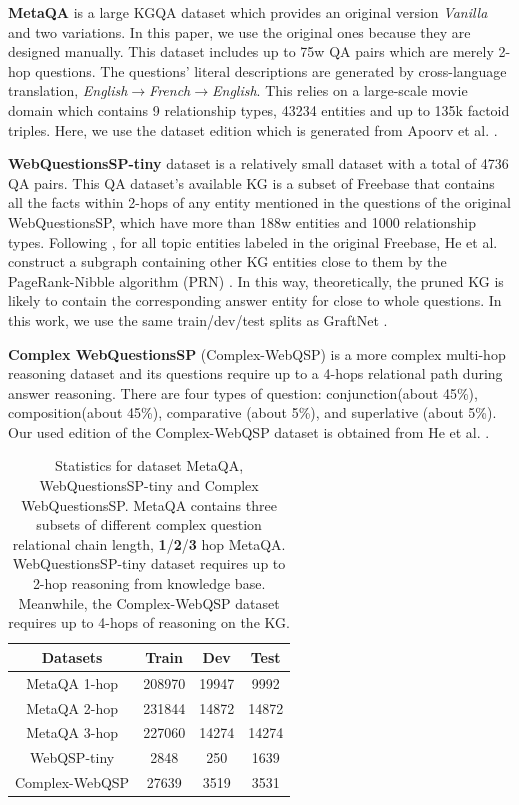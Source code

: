 \documentclass[pdflatex,sn-mathphys]{sn-jnl}%
\theoremstyle{thmstyleone}%
\theoremstyle{thmstyletwo}%
\theoremstyle{thmstylethree}%
\begin{document}
\textbf{MetaQA} \cite{zhang2018metaQA} is a large KGQA dataset which provides an original version \textit{Vanilla} and two variations. In this paper, we use the original ones because they are designed manually. This dataset includes up to 75w QA pairs which are merely 2-hop questions. The questions' literal descriptions are generated by cross-language translation, \textit{English$\rightarrow$French$\rightarrow$English}. This relies on a large-scale movie domain which contains 9 relationship types, 43234 entities and up to 135k factoid triples. Here, we use the dataset edition which is generated from Apoorv et al. \cite{apoorv2020embedKGQA}.

\textbf{WebQuestionsSP-tiny} \cite{tauyih2016wbquestion} dataset is a relatively small dataset with a total of 4736 QA pairs. This QA dataset's available KG is a subset of Freebase  that contains all the facts within 2-hops of any entity mentioned in the questions of the original WebQuestionsSP, which have more than 188w entities and 1000 relationship types. Following \cite{apoorv2020embedKGQA}, for all topic entities labeled in the original Freebase, He et al. \cite{he2021stu-teaQA} construct a subgraph containing other KG entities close to them by the PageRank-Nibble algorithm (PRN) \cite{rpn}. In this way, theoretically, the pruned KG is likely to contain the corresponding answer entity for close to whole questions. In this work, we use the same train/dev/test splits as GraftNet \cite{sun2018graftnet}.

\textcolor[rgb]{1,0,0}{
\textbf{Complex WebQuestionsSP} (Complex-WebQSP)\cite{TalmorCWQ} is a more complex multi-hop reasoning dataset and its questions require up to a 4-hops relational path during answer reasoning. There are four types of question: conjunction(about 45\%),  composition(about 45\%), comparative (about 5\%), and superlative (about 5\%). Our used edition of the Complex-WebQSP dataset is obtained from He et al. \cite{he2021stu-teaQA}.}

\begin{table}[h]
\renewcommand{\arraystretch}{1.2}
\caption{Statistics for dataset MetaQA, WebQuestionsSP-tiny and Complex WebQuestionsSP. MetaQA contains three subsets of different complex question relational chain length, \textbf{1}/\textbf{2}/\textbf{3} hop MetaQA. WebQuestionsSP-tiny dataset requires up to 2-hop reasoning from knowledge base. Meanwhile, the Complex-WebQSP dataset requires up to 4-hops of reasoning on the KG.}
\label{dataset_details}
\centering
\begin{tabular}{c|ccc}  \hline
Datasets & Train & Dev & Test \\ \hline
MetaQA 1-hop & 208970 & 19947 & 9992 \\
MetaQA 2-hop & 231844 & 14872 & 14872 \\ 
MetaQA 3-hop & 227060 & 14274 & 14274 \\ \hline
WebQSP-tiny & 2848 & 250 & 1639 \\ 
\textcolor[rgb]{1,0,0}{Complex-WebQSP} & 27639 & 3519 & 3531 \\ \hline
\end{tabular}
\end{table}
\end{document}
